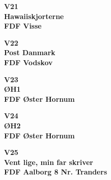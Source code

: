 \vspace*{2cm}
\begin{center}
{\fontsize{300}{60}\selectfont\textbf{\textcolor{søblå}{V21}}\\}
{\fontsize{30}{50}\selectfont\textbf{\textcolor{søblå}{Hawaiiskjorterne}}\\}
{\fontsize{20}{50}\selectfont\textbf{FDF Visse}\\}
\end{center}
\newpage

\vspace*{2cm}
\begin{center}
{\fontsize{300}{60}\selectfont\textbf{\textcolor{søblå}{V22}}\\}
{\fontsize{30}{50}\selectfont\textbf{\textcolor{søblå}{Post Danmark}}\\}
{\fontsize{20}{50}\selectfont\textbf{FDF Vodskov}\\}
\end{center}
\newpage

\vspace*{2cm}
\begin{center}
{\fontsize{300}{60}\selectfont\textbf{\textcolor{søblå}{V23}}\\}
{\fontsize{30}{50}\selectfont\textbf{\textcolor{søblå}{ØH1}}\\}
{\fontsize{20}{50}\selectfont\textbf{FDF Øster Hornum}\\}
\end{center}
\newpage

\vspace*{2cm}
\begin{center}
{\fontsize{300}{60}\selectfont\textbf{\textcolor{søblå}{V24}}\\}
{\fontsize{30}{50}\selectfont\textbf{\textcolor{søblå}{ØH2}}\\}
{\fontsize{20}{50}\selectfont\textbf{FDF Øster Hornum}\\}
\end{center}
\newpage

\vspace*{2cm}
\begin{center}
{\fontsize{300}{60}\selectfont\textbf{\textcolor{søblå}{V25}}\\}
{\fontsize{30}{50}\selectfont\textbf{\textcolor{søblå}{Vent lige, min far skriver}}\\}
{\fontsize{20}{50}\selectfont\textbf{FDF Aalborg 8 Nr. Tranders}\\}
\end{center}
\newpage

\vspace*{2cm}
